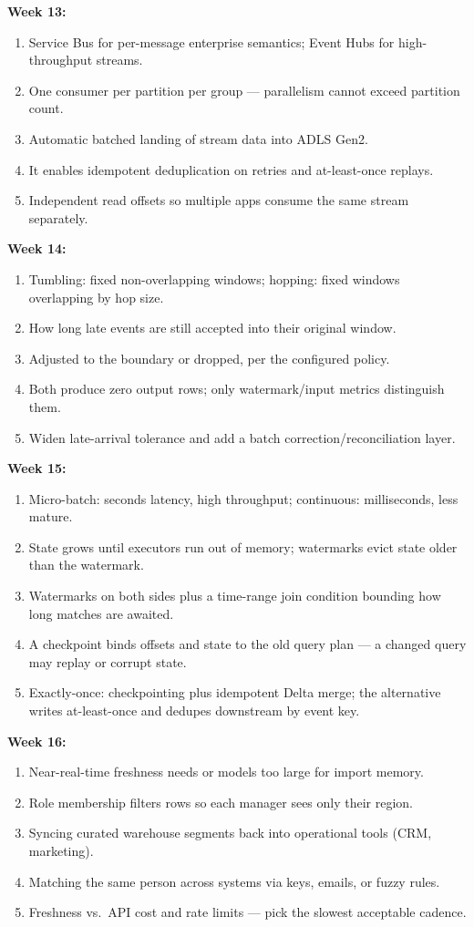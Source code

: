 \documentclass[11pt, a4paper]{article}
\begin{document}
\noindent\textbf{Week 13:}
\begin{enumerate}[itemsep=0pt]
    \item Service Bus for per-message enterprise semantics; Event Hubs for high-throughput streams.
    \item One consumer per partition per group --- parallelism cannot exceed partition count.
    \item Automatic batched landing of stream data into ADLS Gen2.
    \item It enables idempotent deduplication on retries and at-least-once replays.
    \item Independent read offsets so multiple apps consume the same stream separately.
\end{enumerate}
\noindent\textbf{Week 14:}
\begin{enumerate}[itemsep=0pt]
    \item Tumbling: fixed non-overlapping windows; hopping: fixed windows overlapping by hop size.
    \item How long late events are still accepted into their original window.
    \item Adjusted to the boundary or dropped, per the configured policy.
    \item Both produce zero output rows; only watermark/input metrics distinguish them.
    \item Widen late-arrival tolerance and add a batch correction/reconciliation layer.
\end{enumerate}
\noindent\textbf{Week 15:}
\begin{enumerate}[itemsep=0pt]
    \item Micro-batch: seconds latency, high throughput; continuous: milliseconds, less mature.
    \item State grows until executors run out of memory; watermarks evict state older than the watermark.
    \item Watermarks on both sides plus a time-range join condition bounding how long matches are awaited.
    \item A checkpoint binds offsets and state to the old query plan --- a changed query may replay or corrupt state.
    \item Exactly-once: checkpointing plus idempotent Delta merge; the alternative writes at-least-once and dedupes downstream by event key.
\end{enumerate}
\noindent\textbf{Week 16:}
\begin{enumerate}[itemsep=0pt]
    \item Near-real-time freshness needs or models too large for import memory.
    \item Role membership filters rows so each manager sees only their region.
    \item Syncing curated warehouse segments back into operational tools (CRM, marketing).
    \item Matching the same person across systems via keys, emails, or fuzzy rules.
    \item Freshness vs.\ API cost and rate limits --- pick the slowest acceptable cadence.
\end{enumerate}
\end{document}
